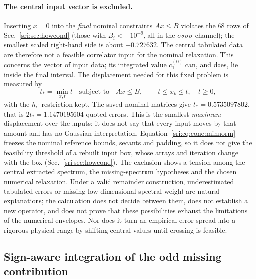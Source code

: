 \paragraph{The central input vector is excluded.} Inserting $x=0$ into the \emph{final} nominal constraints $Ax\le B$
violates the 68 rows of Sec.~\ref{sri:sec:howcond} (those with $B_i<-10^{-9}$, all in the $\sigma\sigma\sigma\sigma$
channel); the smallest scaled right-hand side is about $-0.727632$. The central tabulated data are therefore not a
feasible correlator input for the nominal relaxation. This concerns the vector of input data; its integrated value
$c_1^{(0)}$ can, and does, lie inside the final interval. The displacement needed for this fixed problem is measured by
\begin{equation}
 t_*=\min_{x,t}t\quad\text{subject to}\quad Ax\le B,\quad -t\le x_k\le t,\quad t\ge0,
 \label{sri:eq:cone:minnorm}
\end{equation}
with the $h_{\epsilon'}$ restriction kept. The saved nominal matrices give $t_*=0.5735097802$, that is
$2t_*=1.1470195604$ quoted errors. This is the smallest \emph{maximum} displacement over the inputs; it does not say
that every input moves by that amount and has no Gaussian interpretation. Equation~\eqref{sri:eq:cone:minnorm} freezes the
nominal reference bounds, secants and padding, so it does not give the feasibility threshold of a rebuilt input box,
whose arrays and iteration change with the box (Sec.~\ref{sri:sec:howcond}). The exclusion shows a tension among the central
extracted spectrum, the missing-spectrum hypotheses and the chosen numerical relaxation. Under a valid remainder
construction, underestimated tabulated errors or missing low-dimensional spectral weight are natural explanations; the
calculation does not decide between them, does not establish a new operator, and does not prove that these
possibilities exhaust the limitations of the numerical envelopes. Nor does it turn an empirical error spread into a
rigorous physical range by shifting central values until crossing is feasible.

\subsection{Sign-aware integration of the odd missing contribution}\label{sri:app:cone:sign}
